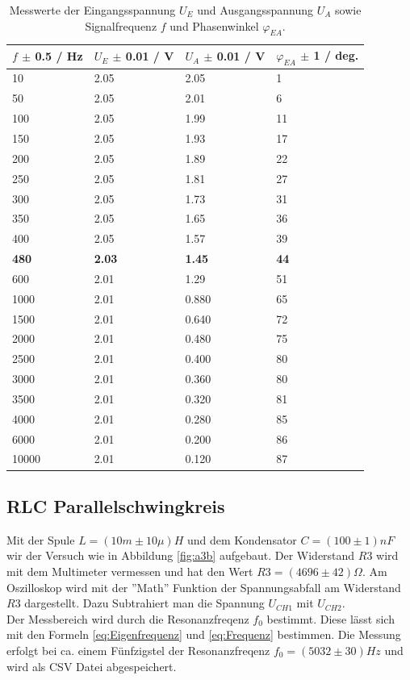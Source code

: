 \documentclass[12pt,a4paper,twoside]{article}
\begin{document}
\begin{table}[H]
    \centering
    \caption{Messwerte der Eingangsspannung $U_E$ und Ausgangsspannung $U_A$ sowie Signalfrequenz $f$ und Phasenwinkel $\varphi_{EA}$. }
    \label{tab:mess2}
    \begin{tabular}{| l | l | l | l |}
        \hline
        $f$ $\pm$ 0.5 / Hz   & $U_E$ $\pm$ 0.01 / V   & $U_A$ $\pm$ 0.01 / V  & $\varphi_{EA}$ $\pm$ 1 / deg. \\
        \hline
        10    & 2.05 & 2.05 & 1 \\
        50    & 2.05 & 2.01 & 6 \\
        100   & 2.05 & 1.99 & 11 \\
        150   & 2.05 & 1.93 & 17 \\
        200   & 2.05 & 1.89 & 22 \\
        250   & 2.05 & 1.81 & 27 \\
        300   & 2.05 & 1.73 & 31 \\
        350   & 2.05 & 1.65 & 36 \\
        400   & 2.05 & 1.57 & 39 \\
        \textbf{480} & \textbf{2.03} & \textbf{1.45}  & \textbf{44} \\
        600   & 2.01 &  1.29  & 51 \\
        1000  & 2.01 & 0.880  & 65 \\
        1500  & 2.01 & 0.640  & 72 \\
        2000  & 2.01 & 0.480  & 75 \\
        2500  & 2.01 & 0.400  & 80 \\
        3000  & 2.01 & 0.360  & 80 \\
        3500  & 2.01 & 0.320  & 81 \\
        4000  & 2.01 & 0.280  & 85 \\
        6000  & 2.01 & 0.200  & 86 \\
        10000 & 2.01 & 0.120  & 87 \\
        \hline
    \end{tabular}
\end{table}

\subsection{RLC Parallelschwingkreis}
Mit der Spule $L = (10m \pm 10 \mu)H$ und dem Kondensator $C = (100 \pm 1)nF$ wir der Versuch wie in Abbildung \ref{fig:a3b} aufgebaut. 
Der Widerstand $R3$ wird mit dem Multimeter vermessen und hat den Wert $R3 = (4696 \pm 42)\Omega$. 
Am Oszilloskop wird mit der ''Math'' Funktion der Spannungsabfall am Widerstand $R3$ dargestellt. 
Dazu Subtrahiert man die Spannung $U_{CH1}$ mit $U_{CH2}$. 
\\
Der Messbereich wird durch die Resonanzfreqenz $f_0$ bestimmt. Diese lässt sich mit den Formeln \ref{eq:Eigenfrequenz} und \ref{eq:Frequenz} bestimmen. 
Die Messung erfolgt bei ca. einem Fünfzigstel der Resonanzfreqenz $f_0 = (5032 \pm 30)Hz$ und wird als CSV Datei abgespeichert. 
\end{document}
